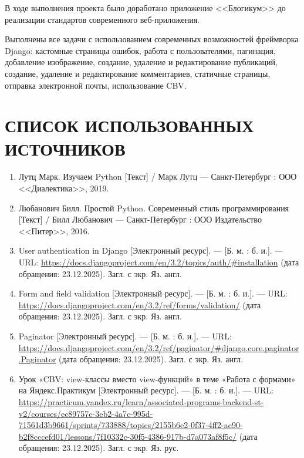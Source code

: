 \documentclass[bachelor, och, pract]{SCWorks}
\begin{document}
В ходе выполнения проекта было доработано приложение <<Блогикум>> до реализации стандартов современного веб-приложения. 

Выполнены все задачи с использованием современных возможностей фреймворка Django: кастомные страницы ошибок, работа с пользователями, пагинация, добавление изображение, создание, удаление и редактирование публикаций, создание, удаление и редактирование комментариев, статичные страницы, отправка электронной почты, использование CBV.

\newpage
\section*{СПИСОК ИСПОЛЬЗОВАННЫХ ИСТОЧНИКОВ}

\begin{enumerate}
    \item Лутц Марк. Изучаем Python [Текст] / Марк Лутц --- Санкт-Петербург :  ООО <<Диалектика>>, 2019.
    \item Любанович Билл. Простой Python. Современный стиль программирования [Текст] / Билл Любанович --- Санкт-Петербург :  ООО Издательство <<Питер>>, 2016.
    \item User authentication in Django [Электронный ресурс]. — [Б. м. : б. и.]. — URL: \url{https://docs.djangoproject.com/en/3.2/topics/auth/#installation} (дата обращения: 23.12.2025). Загл. с экр. Яз. англ.

    \item Form and field validation [Электронный ресурс]. — [Б. м. : б. и.]. — URL: \url{https://docs.djangoproject.com/en/3.2/ref/forms/validation/} (дата обращения: 23.12.2025). Загл. с экр. Яз. англ.
    
    \item Paginator [Электронный ресурс]. — [Б. м. : б. и.]. — URL: \url{https://docs.djangoproject.com/en/3.2/ref/paginator/#django.core.paginator.Paginator} (дата обращения: 23.12.2025). Загл. с экр. Яз. англ.
    
    \item Урок «CBV: view-классы вместо view-функций» в теме «Работа с формами» на Яндекс.Практикум [Электронный ресурс]. — [Б. м. : б. и.]. — URL: \url{https://practicum.yandex.ru/learn/associated-programs-backend-st-v2/courses/ec89757c-3eb2-4a7c-995d-71561d3b9661/sprints/733888/topics/2155b6e2-0f37-4ff2-ae90-b2f8cccefd01/lessons/7f10332c-30f5-4386-917b-d7a073af8f5c/} (дата обращения: 23.12.2025). Загл. с экр. Яз. рус.



\end{enumerate}
\end{document}
